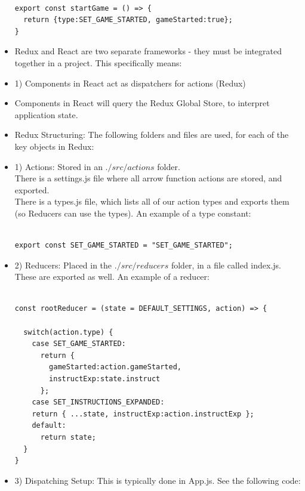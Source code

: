 \documentclass[8pt,a4paper]{extarticle}
\begin{document}
\begin{itemize}
\begin{verbatim}

export const startGame = () => {
  return {type:SET_GAME_STARTED, gameStarted:true};
}

\end{verbatim}

\item Redux and React are two separate frameworks - they must be integrated together in a project. This specifically means: 
\item 1) Components in React act as dispatchers for actions (Redux)
\item Components in React will query the Redux Global Store, to interpret application state.
\item Redux Structuring: The following folders and files are used, for each of the key objects in Redux:
\item 1) Actions: Stored in an $./src/actions$ folder. \\

There is a settings.js file where all arrow function actions are stored, and exported.\\

There is a types.js file, which lists all of our action types and exports them (so Reducers can use the types). An example of a type constant:

\begin{verbatim}

export const SET_GAME_STARTED = "SET_GAME_STARTED";

\end{verbatim}

\item 2) Reducers: Placed in the $./src/reducers$ folder, in a file called index.js. These are exported as well. An example of a reducer:

\begin{verbatim}

const rootReducer = (state = DEFAULT_SETTINGS, action) => {
 
  switch(action.type) { 
    case SET_GAME_STARTED:
      return {
        gameStarted:action.gameStarted,
        instructExp:state.instruct
      }; 
    case SET_INSTRUCTIONS_EXPANDED:       
    return { ...state, instructExp:action.instructExp };
    default:
      return state;
  }
}

\end{verbatim}

\item 3) Dispatching Setup: This is typically done in App.js. See the following code:


\end{itemize}
\end{document}
